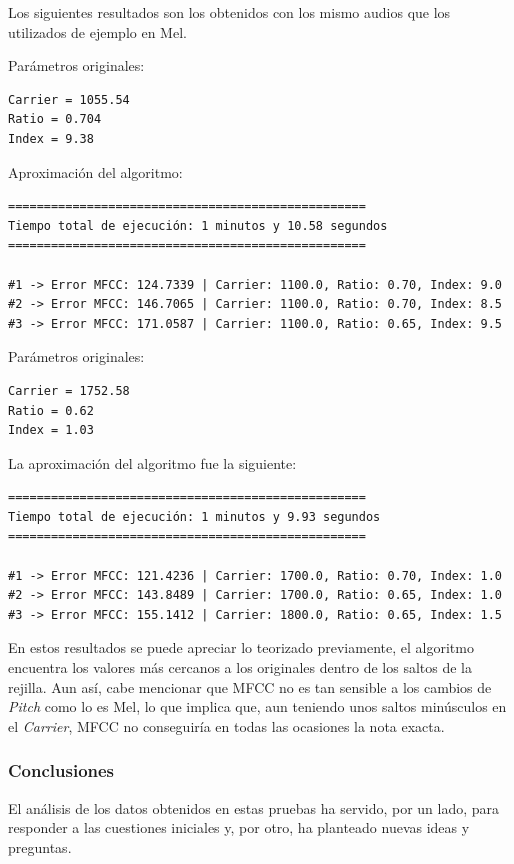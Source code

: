 \documentclass[12pt, a4paper]{article}
\begin{document}
Los siguientes resultados son los obtenidos con los mismo audios que los utilizados de ejemplo en Mel.

Parámetros originales:
\begin{verbatim}
Carrier = 1055.54
Ratio = 0.704
Index = 9.38
\end{verbatim}

Aproximación del algoritmo:

\begin{verbatim}
==================================================
Tiempo total de ejecución: 1 minutos y 10.58 segundos
==================================================

#1 -> Error MFCC: 124.7339 | Carrier: 1100.0, Ratio: 0.70, Index: 9.0
#2 -> Error MFCC: 146.7065 | Carrier: 1100.0, Ratio: 0.70, Index: 8.5
#3 -> Error MFCC: 171.0587 | Carrier: 1100.0, Ratio: 0.65, Index: 9.5
\end{verbatim}

Parámetros originales:
\begin{verbatim}
Carrier = 1752.58
Ratio = 0.62
Index = 1.03
\end{verbatim}

La aproximación del algoritmo fue la siguiente:

\begin{verbatim}
==================================================
Tiempo total de ejecución: 1 minutos y 9.93 segundos
==================================================

#1 -> Error MFCC: 121.4236 | Carrier: 1700.0, Ratio: 0.70, Index: 1.0
#2 -> Error MFCC: 143.8489 | Carrier: 1700.0, Ratio: 0.65, Index: 1.0
#3 -> Error MFCC: 155.1412 | Carrier: 1800.0, Ratio: 0.65, Index: 1.5
\end{verbatim}


En estos resultados se puede apreciar lo teorizado previamente, el algoritmo encuentra los valores
más cercanos a los originales dentro de los saltos de la rejilla. Aun así, cabe mencionar que 
MFCC no es tan sensible a los cambios de \textit{Pitch} como lo es Mel, lo que implica que, aun teniendo
unos saltos minúsculos en el \textit{Carrier}, MFCC no conseguiría en todas las ocasiones la nota exacta.


\subsubsection{Conclusiones}
El análisis de los datos obtenidos en estas pruebas ha servido, por un lado, para responder a las cuestiones
iniciales y, por otro, ha planteado nuevas ideas y preguntas.
\end{document}
